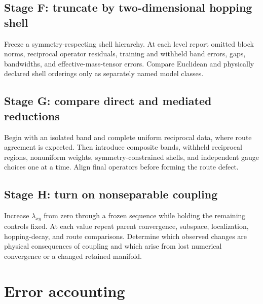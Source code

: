 \subsection*{Stage F: truncate by two-dimensional hopping shell}

Freeze a symmetry-respecting shell hierarchy. At each level report omitted
block norms, reciprocal operator residuals, training and withheld band errors,
gaps, bandwidths, and effective-mass-tensor errors. Compare Euclidean and
physically declared shell orderings only as separately named model classes.

\subsection*{Stage G: compare direct and mediated reductions}

Begin with an isolated band and complete uniform reciprocal data, where route
agreement is expected. Then introduce composite bands, withheld reciprocal
regions, nonuniform weights, symmetry-constrained shells, and independent gauge
choices one at a time. Align final operators before forming the route defect.

\subsection*{Stage H: turn on nonseparable coupling}

Increase $\lambda_{xy}$ from zero through a frozen sequence while holding the
remaining controls fixed. At each value repeat parent convergence, subspace,
localization, hopping-decay, and route comparisons. Determine which observed
changes are physical consequences of coupling and which arise from lost
numerical convergence or a changed retained manifold.

\section*{Error accounting}

